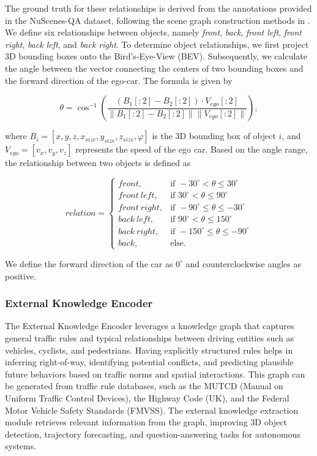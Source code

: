 \documentclass{article} %
\begin{document}
	The ground truth for these relationships is derived from the annotations provided in the NuScenes-QA dataset, following the scene graph construction methods in \cite{qian2024nuscenes}. We define six relationships between objects, namely \textit{front}, \textit{back}, \textit{front left}, \textit{front right}, \textit{back left}, and \textit{back right}. To determine object relationships, we first project 3D bounding boxes onto the Bird’s-Eye-View (BEV). Subsequently, we calculate the angle between the vector connecting the centers of two bounding boxes and the forward direction of the ego-car. The formula is given by  
	
	\begin{equation}
		\theta = \cos^{-1} \left( \frac{(B_1[:2] - B_2[:2]) \cdot V_{ego}[:2]}{\| B_1[:2] - B_2[:2] \| \| V_{ego}[:2] \|} \right),
	\end{equation}
	
	where \( B_i = [x, y, z, x_{size}, y_{size}, z_{size}, \varphi] \) is the 3D bounding box of object \( i \), and \( V_{ego} = [v_x, v_y, v_z] \) represents the speed of the ego car. Based on the angle range, the relationship between two objects is defined as  
	
	\begin{equation}
		relation =
		\begin{cases}
			front, & \text{if } -30^\circ < \theta \leq 30^\circ \\
			front \ left, & \text{if } 30^\circ < \theta \leq 90^\circ \\
			front \ right, & \text{if } -90^\circ \leq \theta \leq -30^\circ \\
			back \ left, & \text{if } 90^\circ < \theta \leq 150^\circ \\
			back \ right, & \text{if } -150^\circ \leq \theta \leq -90^\circ \\
			back, & \text{else.}
		\end{cases}
	\end{equation}
	
	We define the forward direction of the car as \( 0^\circ \) and counterclockwise angles as positive. 
	
	
	\subsubsection{External Knowledge Encoder}
	
	The External Knowledge Encoder leverages a knowledge graph that captures general traffic rules and typical relationships between driving entities such as vehicles, cyclists, and pedestrians. Having explicitly structured rules helps in inferring right-of-way, identifying potential conflicts, and predicting plausible future behaviors based on traffic norms and spatial interactions. This graph can be generated from traffic rule databases, such as the MUTCD (Manual on Uniform Traffic Control Devices), the Highway Code (UK), and the Federal Motor Vehicle Safety Standards (FMVSS). The external knowledge extraction module retrieves relevant information from the graph, improving 3D object detection, trajectory forecasting, and question-answering tasks for autonomous systems.
	
\end{document}
